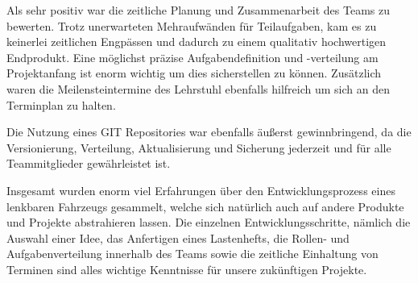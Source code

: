 Als sehr positiv war die zeitliche Planung und Zusammenarbeit des Teams zu bewerten. Trotz unerwarteten Mehraufwänden für Teilaufgaben, kam es zu keinerlei zeitlichen Engpässen und dadurch zu einem qualitativ hochwertigen Endprodukt. Eine möglichst präzise Aufgabendefinition und -verteilung am Projektanfang ist enorm wichtig um dies sicherstellen zu können. Zusätzlich waren die Meilensteintermine des Lehrstuhl ebenfalls hilfreich um sich an den Terminplan zu halten.

Die Nutzung eines GIT Repositories war ebenfalls äußerst gewinnbringend, da die Versionierung, Verteilung, Aktualisierung und Sicherung jederzeit und für alle Teammitglieder gewährleistet ist. 

Insgesamt wurden enorm viel Erfahrungen über den Entwicklungsprozess eines lenkbaren Fahrzeugs gesammelt, welche sich natürlich auch auf andere Produkte und Projekte abstrahieren lassen. Die einzelnen Entwicklungsschritte, nämlich die Auswahl einer Idee, das Anfertigen eines Lastenhefts, die Rollen- und Aufgabenverteilung innerhalb des Teams sowie die zeitliche Einhaltung von Terminen sind alles wichtige Kenntnisse für unsere zukünftigen Projekte.
